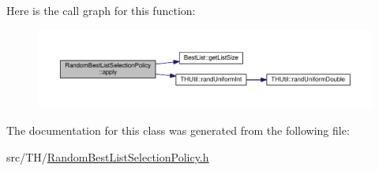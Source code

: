 Here is the call graph for this function\+:\nopagebreak
\begin{figure}[H]
\begin{center}
\leavevmode
\includegraphics[width=350pt]{classRandomBestListSelectionPolicy_ae32f042697269d74c6fed4b9ff6771c8_cgraph}
\end{center}
\end{figure}




The documentation for this class was generated from the following file\+:\begin{DoxyCompactItemize}
\item 
src/\+T\+H/\hyperlink{RandomBestListSelectionPolicy_8h}{Random\+Best\+List\+Selection\+Policy.\+h}\end{DoxyCompactItemize}
